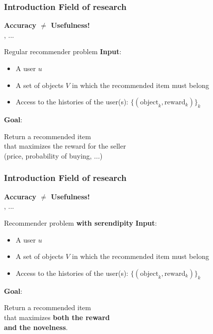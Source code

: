 \documentclass[10pt,frenchb]{beamer}
\begin{document}
\begin{frame}
\frametitle{\textbf{Introduction} Field of research}

\begin{center}\textbf{Accuracy $\neq$ Usefulness!}\\
\cite{abbassi2009getting,kunaver2017diversity}, ...
\end{center}
 

\begin{block}{Regular recommender problem}
\textbf{Input}:
\begin{itemize}
\item A user $u$
\item A set of objects $V$ in which the recommended item must belong
\item Access to the histories of the user(s): $\{(\text{object}_k, \text{reward}_k)\}_{k}$
\end{itemize}
\textbf{Goal}: 
\begin{center}Return a recommended item\\that maximizes the reward for the seller\\(price, probability of buying, ...)\end{center}
\end{block}

\end{frame}

\begin{frame}
\frametitle{\textbf{Introduction} Field of research}

\begin{center}\textbf{Accuracy $\neq$ Usefulness!}\\
\cite{abbassi2009getting,kunaver2017diversity}, ...
\end{center}
 

\begin{block}{Recommender problem \textbf{with serendipity}}
\textbf{Input}:
\begin{itemize}
\item A user $u$
\item A set of objects $V$ in which the recommended item must belong
\item Access to the histories of the user(s): $\{(\text{object}_k, \text{reward}_k)\}_{k}$
\end{itemize}
\textbf{Goal}: 
\begin{center}Return a recommended item\\that maximizes \textbf{both the reward}\\\textbf{and the novelness}.\end{center}
\end{block}

\end{frame}
\end{document}

